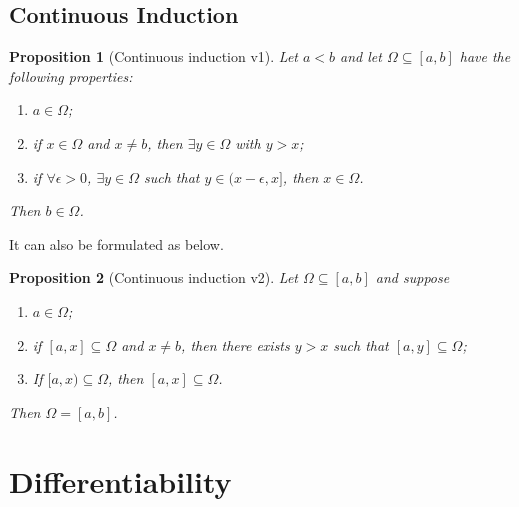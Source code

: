 \documentclass{article}
\theoremstyle{plain}\theoremheaderfont{\normalfont\itshape}\theorembodyfont{\rmfamily}\theoremseparator{.}\newtheorem*{rem}{Remark}\newtheorem*{ex}{Example}\newtheorem*{proof}{Proof}\newtheorem*{altp}{Alternative proof}
\theoremstyle{plain}\theoremheaderfont{\normalfont\bfseries}\theorembodyfont{\rmfamily}\theoremseparator{.}\newtheorem{thm}{Theorem}[section]\newtheorem{lem}[thm]{Lemma}\newtheorem{prop}[thm]{Proposition}\newtheorem*{cor}{Corollary}\newtheorem{defn}[thm]{Definition}\newtheorem{clm}[thm]{Claim}\newtheorem{clminproof}{Claim}
\theoremstyle{break}\theoremheaderfont{\normalfont\itshape}\theorembodyfont{\rmfamily}\theoremseparator{.\medskip}\newtheorem*{proofskip}{Proof}\newtheorem*{exs}{Examples}\newtheorem*{rems}{Remarks}
\theoremstyle{break}\theoremheaderfont{\normalfont\bfseries}\theorembodyfont{\rmfamily}\theoremseparator{.\medskip}\newtheorem{lemskip}[thm]{Lemma}\newtheorem{defnskip}[thm]{Definition}\newtheorem{propskip}[thm]{Proposition}\newtheorem{thmskip}[thm]{Theorem}
\begin{document}
    \subsection{Continuous Induction}
    \begin{prop}[Continuous induction v1]
        Let \(a<b\) and let \(\Omega\subseteq[a,b]\) have the following properties:
        \begin{enumerate}[topsep=0pt,label=(\roman*)]
            \item \(a\in\Omega\);
            \item if \(x\in\Omega\) and \(x\ne b\), then \(\exists y\in\Omega\) with \(y>x\);
            \item if \(\forall\epsilon>0\), \(\exists y\in\Omega\) such that \(y\in(x-\epsilon,x]\), then \(x\in\Omega\).
        \end{enumerate}
        Then \(b\in\Omega\).
    \end{prop}
    It can also be formulated as below.
    \begin{prop}[Continuous induction v2]
        Let \(\Omega\subseteq[a,b]\) and suppose
        \begin{enumerate}[topsep=0pt,label=(\roman*)]
            \item \(a\in \Omega\);
            \item if \([a,x]\subseteq\Omega\) and \(x\ne b\), then there exists \(y>x\) such that \([a,y]\subseteq\Omega\);
            \item If \([a,x)\subseteq\Omega\), then \([a,x]\subseteq\Omega\).
        \end{enumerate}
        Then \(\Omega=[a,b]\).
    \end{prop}
    \section{Differentiability}
\end{document}
